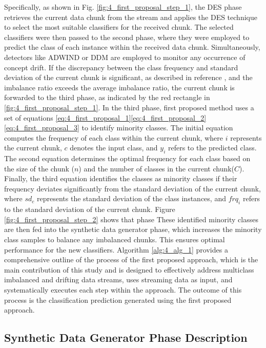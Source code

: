 Specifically, as shown in Fig. \ref{fig:4_first_proposal_step_1}, the DES phase retrieves the current data chunk from the stream and applies the DES technique to select the most suitable classifiers for the received chunk. The selected classifiers were then passed to the second phase, where they were employed to predict the class of each instance within the received data chunk. Simultaneously, detectors like ADWIND or DDM are employed to monitor any occurrence of concept drift. If the discrepancy between the class frequency and standard deviation of the current chunk is significant, as described in reference \cite{gama2004learning}, and the imbalance ratio exceeds the average imbalance ratio, the current chunk is forwarded to the third phase, as indicated by the red rectangle in \ref{fig:4_first_proposal_step_1}. In the third phase, first proposed method uses a set of equations \ref{eq:4_first_proposal_1}\ref{eq:4_first_proposal_2}\ref{eq:4_first_proposal_3}
to identify minority classes. The initial equation computes the frequency of each class within the current chunk, where $i$ represents the current chunk, $c$ denotes the input class, and $y_i$ refers to the predicted class. The second equation determines the optimal frequency for each class based on the size of the chunk ($n$) and the number of classes in the current chunk($C$). Finally, the third equation identifies the classes as minority classes if their frequency deviates significantly from the standard deviation of the current chunk, where $sd_c$ represents the standard deviation of the class instances, and $frq_i$ refers to the standard deviation of the current chunk.
Figure \ref{fig:4_first_proposal_step_2} shows that phase These identified minority classes are then fed into the synthetic data generator phase, which increases the minority class samples to balance any imbalanced chunks. This ensures optimal performance for the new classifiers. Algorithm  \ref{alg:4_alg_1} provides a comprehensive outline of the process of the first proposed approach, which is the main contribution of this study and is designed to effectively address multiclass imbalanced and drifting data streams, uses streaming data as input, and systematically executes each step within the approach. The outcome of this process is the classification prediction generated using the first proposed approach.


\subsection{Synthetic Data Generator Phase Description}

